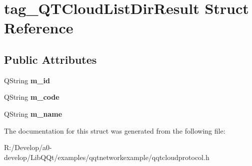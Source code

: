 \hypertarget{structtag___q_t_cloud_list_dir_result}{}\section{tag\+\_\+\+Q\+T\+Cloud\+List\+Dir\+Result Struct Reference}
\label{structtag___q_t_cloud_list_dir_result}
\subsection*{Public Attributes}
\begin{DoxyCompactItemize}
\item 
\mbox{\label{structtag___q_t_cloud_list_dir_result_a0d7be759304d4ab61d0631f191047d83}} 
Q\+String {\bfseries m\+\_\+id}
\item 
\mbox{\label{structtag___q_t_cloud_list_dir_result_a1b764442db3cdff1991dc692a094cb6b}} 
Q\+String {\bfseries m\+\_\+code}
\item 
\mbox{\label{structtag___q_t_cloud_list_dir_result_abb34f45d2cf5320ac45e05cfbe334ab4}} 
Q\+String {\bfseries m\+\_\+name}
\end{DoxyCompactItemize}


The documentation for this struct was generated from the following file\+:\begin{DoxyCompactItemize}
\item 
R\+:/\+Develop/a0-\/develop/\+Lib\+Q\+Qt/examples/qqtnetworkexample/qqtcloudprotocol.\+h\end{DoxyCompactItemize}
